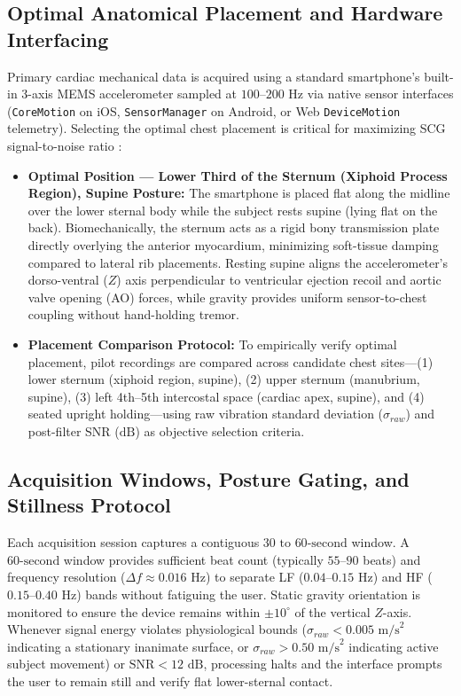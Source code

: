 \subsection{Optimal Anatomical Placement and Hardware Interfacing}
Primary cardiac mechanical data is acquired using a standard smartphone's built-in 3-axis MEMS accelerometer sampled at $100\text{--}200\text{ Hz}$ via native sensor interfaces (\texttt{CoreMotion} on iOS, \texttt{SensorManager} on Android, or Web \texttt{DeviceMotion} telemetry). Selecting the optimal chest placement is critical for maximizing SCG signal-to-noise ratio \cite{inan2015ballistocardiography, tadi2016realtime}:
\begin{itemize}
	\item \textbf{Optimal Position --- Lower Third of the Sternum (Xiphoid Process Region), Supine Posture:} The smartphone is placed flat along the midline over the lower sternal body while the subject rests supine (lying flat on the back). Biomechanically, the sternum acts as a rigid bony transmission plate directly overlying the anterior myocardium, minimizing soft-tissue damping compared to lateral rib placements. Resting supine aligns the accelerometer's dorso-ventral ($Z$) axis perpendicular to ventricular ejection recoil and aortic valve opening (AO) forces, while gravity provides uniform sensor-to-chest coupling without hand-holding tremor.
	\item \textbf{Placement Comparison Protocol:} To empirically verify optimal placement, pilot recordings are compared across candidate chest sites---(1) lower sternum (xiphoid region, supine), (2) upper sternum (manubrium, supine), (3) left 4th--5th intercostal space (cardiac apex, supine), and (4) seated upright holding---using raw vibration standard deviation ($\sigma_{raw}$) and post-filter SNR ($\text{dB}$) as objective selection criteria.
\end{itemize}

\subsection{Acquisition Windows, Posture Gating, and Stillness Protocol}
Each acquisition session captures a contiguous $30\text{ to }60\text{-second}$ window. A $60\text{-second}$ window provides sufficient beat count (typically $55\text{--}90$ beats) and frequency resolution ($\Delta f \approx 0.016\text{ Hz}$) to separate LF ($0.04\text{--}0.15\text{ Hz}$) and HF ($0.15\text{--}0.40\text{ Hz}$) bands without fatiguing the user. Static gravity orientation is monitored to ensure the device remains within $\pm 10^\circ$ of the vertical $Z$-axis. Whenever signal energy violates physiological bounds ($\sigma_{raw} < 0.005\text{ m/s}^2$ indicating a stationary inanimate surface, or $\sigma_{raw} > 0.50\text{ m/s}^2$ indicating active subject movement) or $\text{SNR} < 12\text{ dB}$, processing halts and the interface prompts the user to remain still and verify flat lower-sternal contact.

